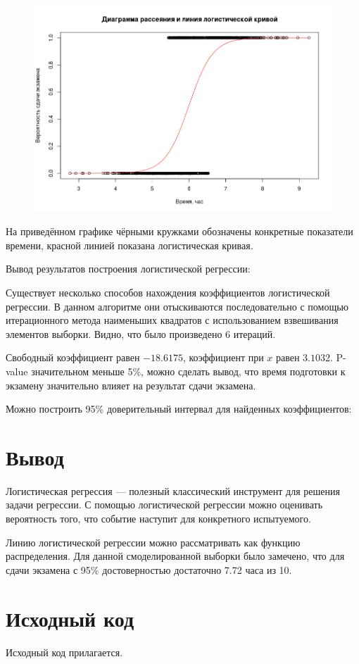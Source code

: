 \documentclass{article} %
\begin{document}
\clearpage
\begin{figure}[H]
    \centering
    \includegraphics[width=\textwidth]{logit}
\end{figure}

На приведённом графике чёрными кружками
обозначены конкретные показатели времени,
красной линией показана логистическая кривая.

Вывод результатов построения логистической регрессии:



Существует несколько способов
нахождения коэффициентов логистической регрессии.
В данном алгоритме они отыскиваются последовательно
с помощью итерационного метода наименьших квадратов
с использованием взвешивания элементов выборки.
Видно, что было произведено 6 итераций.

Свободный коэффициент равен $-18.6175$,
коэффициент при $x$ равен $3.1032$.
P-value значительном меньше 5\%,
можно сделать вывод,
что время подготовки к экзамену
значительно влияет на результат сдачи экзамена.

Можно построить 95\% доверительный интервал для найденных коэффициентов:



\section*{Вывод}
Логистическая регрессия ---
полезный классический инструмент
для решения задачи регрессии.
С помощью логистической регрессии
можно оценивать вероятность того,
что событие наступит для конкретного испытуемого.

Линию логистической регрессии
можно рассматривать как функцию распределения.
Для данной смоделированной выборки
было замечено, что для сдачи экзамена
с 95\% достоверностью достаточно 7.72 часа из 10.

\section*{Исходный код}
Исходный код прилагается.
\end{document}
